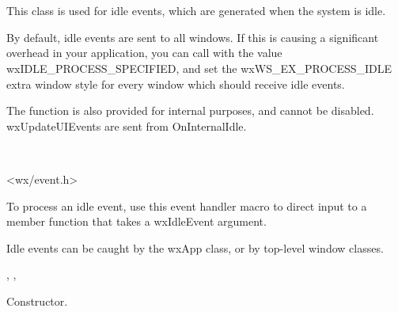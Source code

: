 \section{}\label{wxidleevent}

This class is used for idle events, which are generated when the system is idle.

By default, idle events are sent to all windows. If this is causing a significant
overhead in your application, you can call  with
the value wxIDLE\_PROCESS\_SPECIFIED, and set the wxWS\_EX\_PROCESS\_IDLE extra
window style for every window which should receive idle events.

The function  is
also provided for internal purposes, and cannot be disabled. wxUpdateUIEvents
are sent from OnInternalIdle.


\\


<wx/event.h>


To process an idle event, use this event handler macro to direct input to a member
function that takes a wxIdleEvent argument.

\twocolwidtha{7cm}
\begin{twocollist}\itemsep=0pt
\end{twocollist}%


Idle events can be caught by the wxApp class, or by top-level window classes.


, , 




Constructor.

\label{wxidleeventcansend}

